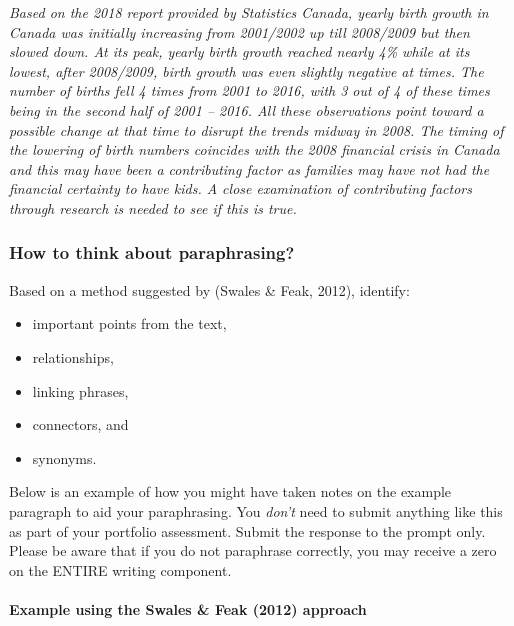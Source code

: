 \documentclass[
  openany]{book}
\providecommand{\tightlist}{%
  \setlength{\itemsep}{0pt}\setlength{\parskip}{0pt}}
\begin{document}
\emph{Based on the 2018 report provided by Statistics Canada, yearly birth growth in Canada was initially increasing from 2001/2002 up till 2008/2009 but then slowed down. At its peak, yearly birth growth reached nearly 4\% while at its lowest, after 2008/2009, birth growth was even slightly negative at times. The number of births fell 4 times from 2001 to 2016, with 3 out of 4 of these times being in the second half of 2001 -- 2016. All these observations point toward a possible change at that time to disrupt the trends midway in 2008. The timing of the lowering of birth numbers coincides with the 2008 financial crisis in Canada and this may have been a contributing factor as families may have not had the financial certainty to have kids. A close examination of contributing factors through research is needed to see if this is true.}

\hypertarget{how-to-think-about-paraphrasing}{%
\subsubsection{How to think about paraphrasing?}\label{how-to-think-about-paraphrasing}}

Based on a method suggested by (Swales \& Feak, 2012), identify:

\begin{itemize}
\tightlist
\item
  important points from the text,\\
\item
  relationships,\\
\item
  linking phrases,\\
\item
  connectors, and\\
\item
  synonyms.
\end{itemize}

Below is an example of how you might have taken notes on the example paragraph to aid your paraphrasing. You \emph{don't} need to submit anything like this as part of your portfolio assessment. Submit the response to the prompt only. Please be aware that if you do not paraphrase correctly, you may receive a zero on the ENTIRE writing component.

\hypertarget{example-using-the-swales-feak-2012-approach}{%
\paragraph{Example using the Swales \& Feak (2012) approach}\label{example-using-the-swales-feak-2012-approach}}
\end{document}
